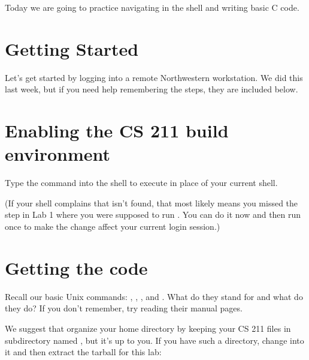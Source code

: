 \documentclass{tufte-handout}
\begin{document}
\maketitle

Today we are going to practice navigating in the shell and writing basic
C code.

\section{Getting Started}

Let's get started by logging into a remote Northwestern workstation. We
did this last week, but if you need help remembering the steps, they are
included below.

\section{Enabling the CS 211 build environment}

Type the command 
into the shell to execute
 in place of your current shell.

(If your shell complains that  isn’t found, that most
likely means you missed the step in Lab 1 where you were supposed to run
. You can do it now and then run
 once to make the change affect your current login
session.)

\section{Getting the code}

Recall our basic Unix commands: , ,
, and . What do they stand for and what do
they do? If you don't remember, try reading their manual pages.

We suggest that organize your home directory by keeping your CS 211
files in subdirectory named , but it's up to you. If you have
such a directory, change into it and then extract the tarball for this
lab:
\end{document}
